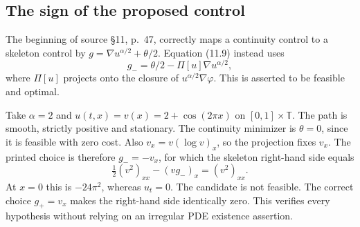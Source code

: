\documentclass[10pt]{article}
\begin{document}
\subsection*{The sign of the proposed control}
The beginning of source §11, p. 47, correctly maps a continuity control to a skeleton control by \(g=\nabla u^{\alpha/2}+\theta/2\). Equation (11.9) instead uses \[g_-=\theta/2-\Pi[u]\nabla u^{\alpha/2},\] where \(\Pi[u]\) projects onto the closure of \(u^{\alpha/2}\nabla\varphi\). This is asserted to be feasible and optimal.\par
Take \(\alpha=2\) and \(u(t,x)=v(x)=2+\cos(2\pi x)\) on \([0,1]\times\mathbb T\). The path is smooth, strictly positive and stationary. The continuity minimizer is \(\theta=0\), since it is feasible with zero cost. Also \(v_x=v(\log v)_x\), so the projection fixes \(v_x\). The printed choice is therefore \(g_-=-v_x\), for which the skeleton right-hand side equals \[\tfrac12(v^2)_{xx}-(vg_-)_x=(v^2)_{xx}.\] At \(x=0\) this is \(-24\pi^2\), whereas \(u_t=0\). The candidate is not feasible. The correct choice \(g_+=v_x\) makes the right-hand side identically zero. This verifies every hypothesis without relying on an irregular PDE existence assertion.\par
\end{document}
